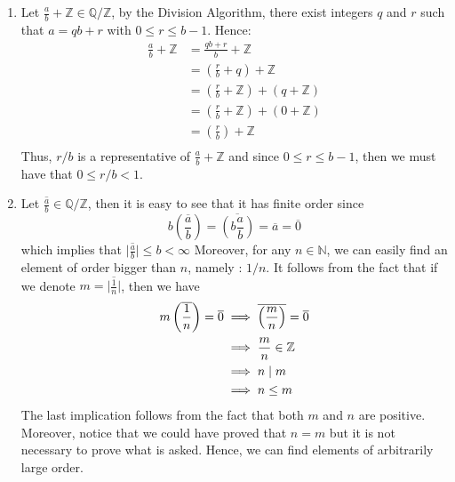 \begin{solution}
    \begin{enumerate}[label = \textbf{(\alph*)}]
        \item Let $\frac{a}{b}+\mathbb{Z} \in \mathbb{Q/Z}$, by the Division Algorithm, there exist integers $q$ and $r$ such that $a = qb + r$ with $0 \leq r \leq b-1$. Hence:
        \begin{align*}
            \frac{a}{b}+\mathbb{Z} &= \frac{qb + r}{b}+\mathbb{Z} \\
            &= \left(\frac{r}{b} + q\right) +\mathbb{Z} \\
            &= \left(\frac{r}{b} +\mathbb{Z}\right) + \left(q +\mathbb{Z}\right) \\
            &= \left(\frac{r}{b} +\mathbb{Z}\right) + \left(0 +\mathbb{Z}\right) \\
            &= \left(\frac{r}{b}\right) +\mathbb{Z} \\
        \end{align*}
        Thus, $r/b$ is a representative of $\frac{a}{b}+\mathbb{Z}$ and since $0 \leq r \leq b-1$, then we must have that $0 \leq r/b < 1$.

        \item Let $\overline{\frac{a}{b}} \in \mathbb{Q/Z}$, then it is easy to see that it has finite order since 
        $$b \left(\overline{\frac{a}{b}}\right) = \overline{\left(b\frac{a}{b}\right)} = \overline{a} = \overline{0}$$
        which implies that $\bigl|\overline{\frac{a}{b}} \bigr| \leq b < \infty$
        Moreover, for any $n \in \mathbb{N}$, we can easily find an element of order bigger than $n$, namely : $1/n$. It follows from the fact that if we denote $m = \bigl|\overline{\frac{1}{n}} \bigr|$, then we have
        \begin{align*}
            m \left(\overline{\frac{1}{n}}\right) = \overline{0} &\implies \overline{\left(\frac{m}{n}\right)} = \overline{0} \\
            &\implies \frac{m}{n} \in \mathbb{Z} \\
            &\implies n \mathrel{|} m \\
            &\implies n \leq m
        \end{align*}
        The last implication follows from the fact that both $m$ and $n$ are positive. Moreover, notice that we could have proved that $n = m$ but it is not necessary to prove what is asked. Hence, we can find elements of arbitrarily large order.


\end{enumerate}
\end{solution}
